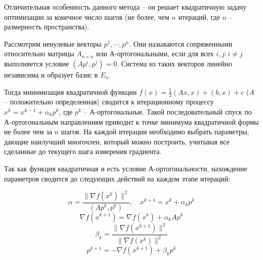 \documentclass[12pt]{article}
\begin{document}
Отличительная особенность данного метода -- он решает квадратичную задачу оптимизации за конечное число шагов (не более, чем $n$ итераций, где $n$ -- размерность пространства).

Рассмотрим ненулевые векторы $p^1, \cdots, p^n$. Они называются сопряженными относительно матрицы $A_{n \times n}$ или А-ортогональными, если для всех $i, j: i \neq j$ выполняется условие $\left(Ap^i, p^j \right) = 0$. Система из таких векторов линейно независима и образует базис в $E_n$. 

Тогда минимизация квадратичной функции $f(x) = \frac{1}{2} \left(Ax, x \right) + \left(b, x \right) + c$ ($A$ -- положительно определенная) сводится к итерационному процессу $x^k=x^{k-1}+\alpha_k p^k$, где $p^k$ -- А-ортогональные. Такой последовательный спуск по А-ортогональным направлениям приводит к точке минимума квадратичной формы не более чем за $n$ шагов. На каждой итерации необходимо выбрать параметры, дающие наилучший многочлен, который можно построить, учитывая все сделанные до текущего шага измерения градиента.

Так как функция квадратичная и есть условие А-ортогональности, нахождение параметров сводится до следующих действий на каждом этапе итераций:

\[ \alpha = \frac{\lVert \nabla f(x^k) \rVert^2}{\left(Ap^k, p^k\right)}, \quad x^{k+1} = x^k+\alpha_k p^k \]
\[ \nabla f(x^{k+1}) = \nabla f(x^k) + \alpha_k Ap^k \]
\[ \beta_k = \frac{\lVert \nabla f(x^{k+1}) \rVert ^2}{\lVert \nabla f(x^{k}) \rVert ^2} \] 
\[ p^{k+1} = -\nabla f(x^{k+1}) + \beta_k p^k \]
\end{document}
